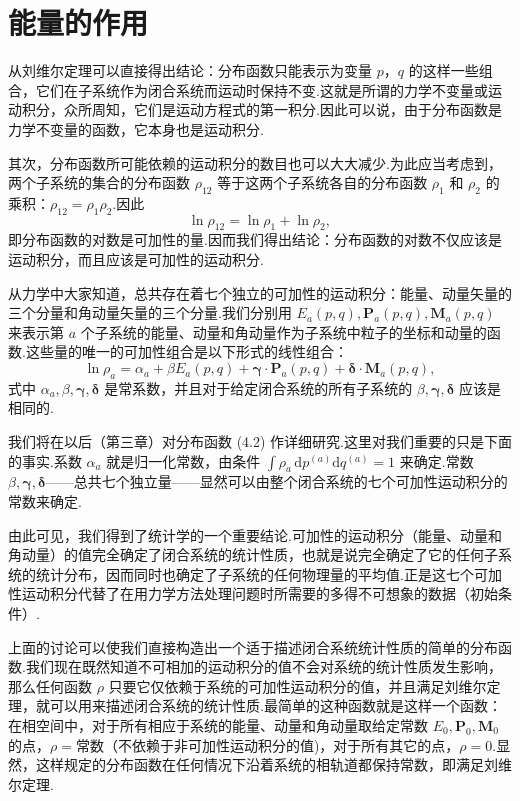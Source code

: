 \section{能量的作用}

从刘维尔定理可以直接得出结论：分布函数只能表示为变量 $p$，$q$ 的这样一些组合，它们在子系统作为闭合系统而运动时保持不变.这就是所谓的力学不变量或运动积分，众所周知，它们是运动方程式的第一积分.因此可以说，由于分布函数是力学不变量的函数，它本身也是运动积分.

其次，分布函数所可能依赖的运动积分的数目也可以大大减少.为此应当考虑到，两个子系统的集合的分布函数 $\rho_{12}$ 等于这两个子系统各自的分布函数 $\rho_1$ 和 $\rho_2$ 的乘积：$\rho_{12}=\rho_1\rho_2$.因此
\begin{equation}
  \ln\rho_{12}=\ln\rho_1+\ln\rho_2,
\end{equation}
即分布函数的对数是可加性的量.因而我们得出结论：分布函数的对数不仅应该是运动积分，而且应该是可加性的运动积分.

从力学中大家知道，总共存在着七个独立的可加性的运动积分：能量、动量矢量的三个分量和角动量矢量的三个分量.我们分别用 $E_a(p,q),\boldsymbol{P}_a(p,q),\boldsymbol{M}_a(p,q)$ 来表示第 $a$ 个子系统的能量、动量和角动量作为子系统中粒子的坐标和动量的函数.这些量的唯一的可加性组合是以下形式的线性组合：
\begin{equation}
  \ln\rho_a=\alpha_a+\beta E_a(p,q)
  +\boldsymbol{\gamma}\cdot\boldsymbol{P}_a(p,q)
  +\boldsymbol{\delta}\cdot\boldsymbol{M}_a(p,q),
\end{equation}
式中 $\alpha_a,\beta,\boldsymbol{\gamma},\boldsymbol{\delta}$ 是常系数，并且对于给定闭合系统的所有子系统的 $\beta,\boldsymbol{\gamma},\boldsymbol{\delta}$ 应该是相同的.

我们将在以后（第三章）对分布函数 (4.2) 作详细研究.这里对我们重要的只是下面的事实.系数 $\alpha_a$ 就是归一化常数，由条件 $\int\rho_a\,\mathrm{d}p^{(a)}\mathrm{d}q^{(a)}=1$ 来确定.常数 $\beta,\boldsymbol{\gamma},\boldsymbol{\delta}$——总共七个独立量——显然可以由整个闭合系统的七个可加性运动积分的常数来确定.

由此可见，我们得到了统计学的一个重要结论.可加性的运动积分（能量、动量和角动量）的值完全确定了闭合系统的统计性质，也就是说完全确定了它的任何子系统的统计分布，因而同时也确定了子系统的任何物理量的平均值.正是这七个可加性运动积分代替了在用力学方法处理问题时所需要的多得不可想象的数据（初始条件）.

上面的讨论可以使我们直接构造出一个适于描述闭合系统统计性质的简单的分布函数.我们现在既然知道不可相加的运动积分的值不会对系统的统计性质发生影响，那么任何函数 $\rho$ 只要它仅依赖于系统的可加性运动积分的值，并且满足刘维尔定理，就可以用来描述闭合系统的统计性质.最简单的这种函数就是这样一个函数：在相空间中，对于所有相应于系统的能量、动量和角动量取给定常数 $E_0,\boldsymbol{P}_0,\boldsymbol{M}_0$ 的点，$\rho=$常数（不依赖于非可加性运动积分的值)，对于所有其它的点，$\rho=0$.显然，这样规定的分布函数在任何情况下沿着系统的相轨道都保持常数，即满足刘维尔定理.

